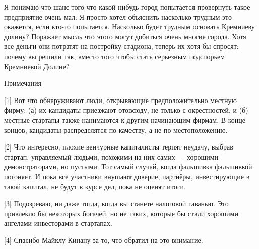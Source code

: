\documentclass[ebook,12pt,oneside,openany]{memoir}
\begin{document}
Я понимаю что шанс того что какой-нибудь город попытается провернуть
такое предприятие очень мал. Я просто хотел объяснить насколько
трудным это окажется, если кто-то попытается. Насколько будет трудным
основать Кремниеву долину? Поражает мысль что этого могут добиться
очень многие города. Хотя все деньги они потратят на постройку
стадиона, теперь их хотя бы спросят: почему вы решили так, вместо того
чтобы стать серьезным подспорьем Кремниевой Долине?

Примечания

[1] Вот что обнаруживают люди, открывающие предположительно местную
фирму: (а) их кандидаты приезжают отовсюду, не только с окрестностей,
и (б) местные стартапы также нанимаются к другим начинающим фирмам. В
конце концов, кандидаты распределятся по качеству, а не по
местоположению.

[2] Что интересно, плохие венчурные капиталисты терпят неудачу, выбрав
стартап, управляемый людьми, похожими на них самих — хорошими
демонстраторами, но пустыми. Тот самый случай, когда фальшивка
фальшивкой погоняет. И пока все участники внушают доверие, партнёры,
инвестирующие в такой капитал, не будут в курсе дел, пока не оценят
итоги.

[3] Подозреваю, ни даже тогда, когда вы станете налоговой гаванью. Это
привлекло бы некоторых богачей, но не таких, которые бы стали хорошими
ангелами-инвесторами в стартапах.

[4] Спасибо Майклу Кинану за то, что обратил на это внимание.
\end{document}
